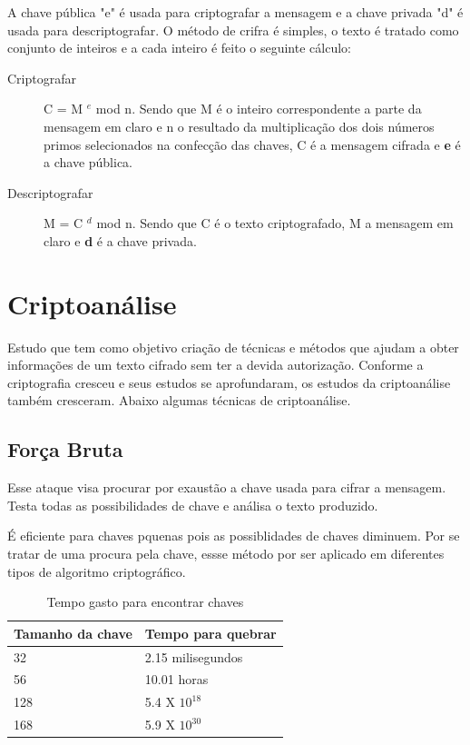 %
A chave pública "e" é usada para criptografar a mensagem e a chave privada "d" é usada para descriptografar. O método de crifra é simples, o texto é tratado como conjunto de inteiros e a cada inteiro é feito o seguinte cálculo:

\begin{description}
\item [Criptografar]
C = M $^ e$ mod n. Sendo que M é o inteiro correspondente a parte da mensagem em claro e n o resultado da multiplicação dos dois números primos selecionados na confecção  das chaves, C é a mensagem cifrada e \textbf{e} é a chave pública. 
\item [Descriptografar]
M = C $^ d$ mod n. Sendo que C é o texto criptografado, M a mensagem em claro e \textbf{d} é a chave privada.
\end{description}

%
\section{Criptoanálise}
\label{cryptanalysis}

Estudo que tem como objetivo criação de técnicas e métodos que ajudam a obter informações de um texto cifrado sem ter a devida autorização. Conforme a criptografia cresceu e seus estudos se aprofundaram, os estudos da criptoanálise também cresceram. Abaixo algumas técnicas de criptoanálise.

\subsection{Força Bruta}
\label{brute-force}

Esse ataque visa procurar por exaustão a chave usada para cifrar a mensagem. Testa todas as possibilidades de chave e análisa o texto produzido. 

É eficiente para chaves pquenas pois as possiblidades de chaves diminuem. Por se tratar de uma procura pela chave, essse método por ser aplicado em diferentes tipos de algoritmo criptográfico.

\begin{table}[h]
\centering
	\begin{tabular}{|l|l|}
		\hline
		Tamanho da chave & Tempo para quebrar \\ \hline
		32 & 2.15 milisegundos \\ \hline
		56 & 10.01 horas \\ \hline
		128 & 5.4 X $ 10 ^ 18$ \\ \hline
		168 & 5.9 X $ 10 ^30$ \\ \hline
	\end{tabular}
\caption{Tempo gasto para encontrar chaves}
\end{table}

